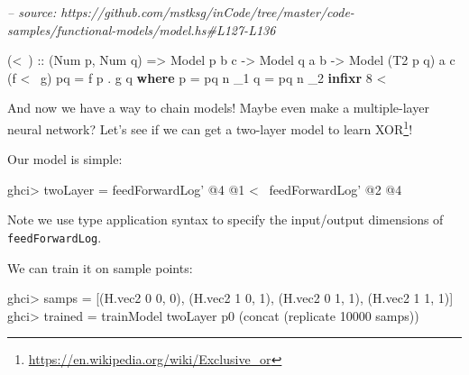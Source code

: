 \documentclass[]{article}
\newenvironment{Shaded}{}{}
\newcommand{\CommentTok}[1]{\textcolor[rgb]{0.38,0.63,0.69}{\textit{#1}}}
\newcommand{\DataTypeTok}[1]{\textcolor[rgb]{0.56,0.13,0.00}{#1}}
\newcommand{\DecValTok}[1]{\textcolor[rgb]{0.25,0.63,0.44}{#1}}
\newcommand{\FunctionTok}[1]{\textcolor[rgb]{0.02,0.16,0.49}{#1}}
\newcommand{\KeywordTok}[1]{\textcolor[rgb]{0.00,0.44,0.13}{\textbf{#1}}}
\newcommand{\NormalTok}[1]{#1}
\newcommand{\OtherTok}[1]{\textcolor[rgb]{0.00,0.44,0.13}{#1}}
\renewcommand{\href}[2]{#2\footnote{\url{#1}}}
\begin{document}
\begin{Shaded}
\begin{Highlighting}[]
\CommentTok{-- source: https://github.com/mstksg/inCode/tree/master/code-samples/functional-models/model.hs#L127-L136}

\NormalTok{(}\FunctionTok{<~}\NormalTok{)}
\OtherTok{    ::}\NormalTok{ (}\DataTypeTok{Num}\NormalTok{ p, }\DataTypeTok{Num}\NormalTok{ q)}
    \OtherTok{=>} \DataTypeTok{Model}\NormalTok{     p    b c}
    \OtherTok{->} \DataTypeTok{Model}\NormalTok{       q  a b}
    \OtherTok{->} \DataTypeTok{Model}\NormalTok{ (}\DataTypeTok{T2}\NormalTok{ p q) a c}
\NormalTok{(f }\FunctionTok{<~}\NormalTok{ g) pq }\FunctionTok{=}\NormalTok{ f p }\FunctionTok{.}\NormalTok{ g q}
  \KeywordTok{where}
\NormalTok{    p }\FunctionTok{=}\NormalTok{ pq }\FunctionTok{^^.}\NormalTok{ _1}
\NormalTok{    q }\FunctionTok{=}\NormalTok{ pq }\FunctionTok{^^.}\NormalTok{ _2}
\KeywordTok{infixr} \DecValTok{8} \FunctionTok{<~}
\end{Highlighting}
\end{Shaded}

And now we have a way to chain models! Maybe even make a multiple-layer neural
network? Let's see if we can get a two-layer model to learn
\href{https://en.wikipedia.org/wiki/Exclusive_or}{XOR}!

Our model is simple:

\begin{Shaded}
\begin{Highlighting}[]
\NormalTok{ghci}\FunctionTok{>}\NormalTok{ twoLayer }\FunctionTok{=}\NormalTok{ feedForwardLog' }\FunctionTok{@}\DecValTok{4} \FunctionTok{@}\DecValTok{1} \FunctionTok{<~}\NormalTok{ feedForwardLog' }\FunctionTok{@}\DecValTok{2} \FunctionTok{@}\DecValTok{4}
\end{Highlighting}
\end{Shaded}

Note we use type application syntax to specify the input/output dimensions of
\texttt{feedForwardLog\textquotesingle{}}.

We can train it on sample points:

\begin{Shaded}
\begin{Highlighting}[]
\NormalTok{ghci}\FunctionTok{>}\NormalTok{ samps }\FunctionTok{=}\NormalTok{ [(H.vec2 }\DecValTok{0} \DecValTok{0}\NormalTok{, }\DecValTok{0}\NormalTok{), (H.vec2 }\DecValTok{1} \DecValTok{0}\NormalTok{, }\DecValTok{1}\NormalTok{), (H.vec2 }\DecValTok{0} \DecValTok{1}\NormalTok{, }\DecValTok{1}\NormalTok{), (H.vec2 }\DecValTok{1} \DecValTok{1}\NormalTok{, }\DecValTok{1}\NormalTok{)]}
\NormalTok{ghci}\FunctionTok{>}\NormalTok{ trained }\FunctionTok{=}\NormalTok{ trainModel twoLayer p0 (concat (replicate }\DecValTok{10000}\NormalTok{ samps))}
\end{Highlighting}
\end{Shaded}
\end{document}

